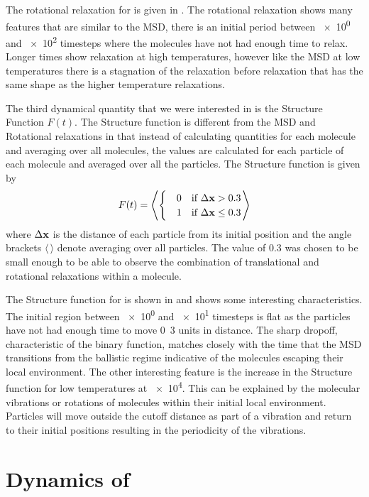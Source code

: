 The rotational relaxation for \sone is given in . The rotational relaxation shows many features that are similar to the MSD, there is an initial period between \num{e0} and \num{e2} timesteps where the molecules have not had enough time to relax. Longer times show relaxation at high temperatures, however like the MSD at low temperatures there is a stagnation of the relaxation before relaxation that has the same shape as the higher temperature relaxations.

The third dynamical quantity that we were interested in is the Structure Function $F(t)$. The Structure function is different from the MSD and Rotational relaxations in that instead of calculating quantities for each molecule and averaging over all molecules, the values are calculated for each particle of each molecule and averaged over all the particles. The Structure function is given by
\begin{align}
    F(t) = \left \langle \begin{cases}
        \quad0 &\text{if } \Delta \mathbf{x} > 0.3 \\
        \quad1 &\text{if } \Delta \mathbf{x} \leq 0.3
    \end{cases} \right \rangle
\end{align}
where $\Delta \mathbf{x}$ is the distance of each particle from its initial position and the angle brackets $\langle\,\rangle$ denote averaging over all particles. The value of \num{0.3} was chosen to be small enough to be able to observe the combination of translational and rotational relaxations within a molecule.

The Structure function for \sone is shown in  and shows some interesting characteristics. The initial region between \num{e0} and \num{e1} timesteps is flat as the particles have not had enough time to move \si{0.3} units in distance. The sharp dropoff, characteristic of the binary function, matches closely with the time that the MSD transitions from the ballistic regime indicative of the molecules escaping their local environment. The other interesting feature is the increase in the Structure function for low temperatures at \num{e4}. This can be explained by the molecular vibrations or rotations of molecules within their initial local environment. Particles will move outside the cutoff distance as part of a vibration and return to their initial positions resulting in the periodicity of the vibrations.

\section{Dynamics of \scon}

